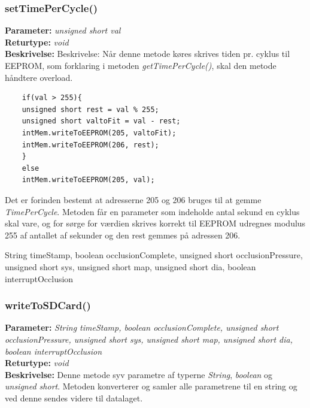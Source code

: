 \subsubsection{setTimePerCycle()}
\textbf{Parameter: } \textit{unsigned short val}
\\ \textbf{Returtype: } \textit{void}
\\ \textbf{Beskrivelse: } Beskrivelse: Når denne metode køres skrives tiden pr. cyklus til EEPROM, som forklaring i metoden \textit{getTimePerCycle()}, skal den metode håndtere overload. 
\begin{lstlisting}
	if(val > 255){
	unsigned short rest = val % 255;
	unsigned short valtoFit = val - rest;
	intMem.writeToEEPROM(205, valtoFit);
	intMem.writeToEEPROM(206, rest);
	}
	else
	intMem.writeToEEPROM(205, val);
\end{lstlisting}
Det er forinden bestemt at adresserne 205 og 206 bruges til at gemme \textit{TimePerCycle}. Metoden får en parameter som indeholde antal sekund en cyklus skal vare, og for sørge for værdien skrives korrekt til EEPROM udregnes modulus 255 af antallet af sekunder og den rest gemmes på adressen 206. 

String timeStamp, boolean occlusionComplete, unsigned short occlusionPressure, unsigned short sys, unsigned short map, unsigned short dia, boolean interruptOcclusion

\subsubsection{writeToSDCard()}
\textbf{Parameter: } \textit{String timeStamp, boolean occlusionComplete, unsigned short occlusionPressure, unsigned short sys, unsigned short map, unsigned short dia, boolean interruptOcclusion}
\\ \textbf{Returtype: } \textit{void}
\\ \textbf{Beskrivelse: }  Denne metode syv parametre af typerne \textit{String}, \textit{boolean} og \textit{unsigned short}. Metoden konverterer og samler alle parametrene til en string og ved denne sendes videre til datalaget.